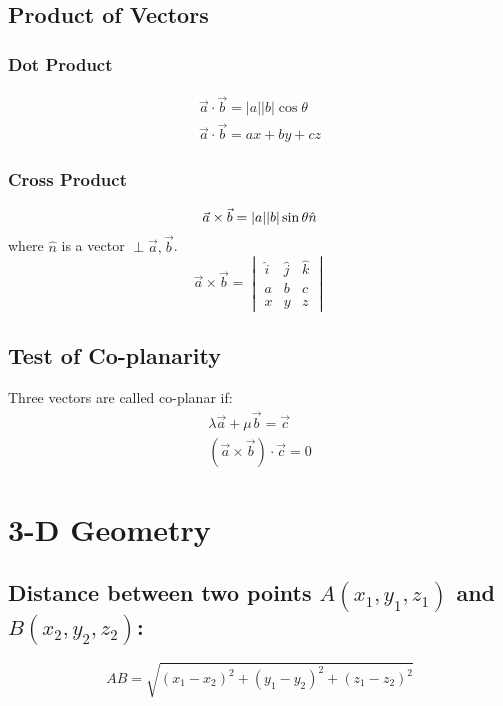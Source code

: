 \documentclass[openany, oneside]{book}
\begin{document}
\section{Product of Vectors}
\subsection{Dot Product}
\begin{align}
\vec{a}\cdot\vec{b}=\lvert a \rvert \lvert b \rvert\cos\theta\\
\vec{a}\cdot\vec{b}=ax+by+cz
\end{align}

\subsection{Cross Product}
\begin{equation}
\vec{a}\times\vec{b}=\lvert a \rvert \lvert b \rvert \sin\theta \hat{n}\\
\end{equation}
where $\hat{n}$ is a vector $\perp\vec{a},\vec{b}$.
\begin{equation}
\vec{a}\times\vec{b}=\begin{vmatrix}
\hat{i}&\hat{j}&\hat{k}\\
a&b&c\\
x&y&z
\end{vmatrix}
\end{equation}

\section{Test of Co-planarity}
Three vectors are called co-planar if:
\begin{align}
\lambda\vec{a}+\mu\vec{b}=\vec{c}\\
(\vec{a}\times\vec{b})\cdot\vec{c}=0
\end{align}

\large{\chapter{3-D Geometry}}
\section{Distance between two points $A(x_1,y_1,z_1)$ and $B(x_2,y_2,z_2)$:\newline}
\begin{equation}
AB=\sqrt{(x_1-x_2)^2+(y_1-y_2)^2+(z_1-z_2)^2}
\end{equation}
\end{document}
